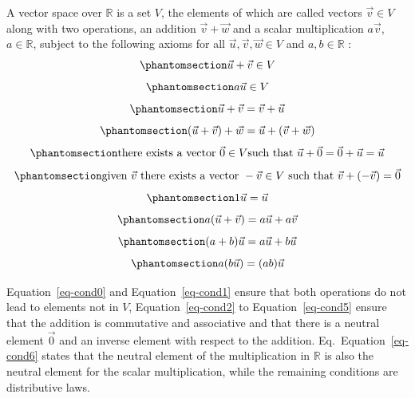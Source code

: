 \documentclass[
  letterpaper,
  DIV=11,
  numbers=noendperiod]{scrartcl}
\theoremstyle{remark}
\newenvironment{fbxSimple}[3]{\begin{tcolorbox}[enhanced, breakable,%
attach boxed title to top*={xshift=1.4pt},
boxed title style={boxrule=0.0mm, fuzzy shadow={1pt}{-1pt}{0mm}{0.1mm}{gray}, arc=.3em, rounded corners=east, sharp corners=west}, colframe=#1-color2, colbacktitle=#1-color1, colback = white, coltitle=black,  titlerule=0mm, toprule=0pt, bottomrule=.7pt, leftrule=.3em, rightrule=.7pt, outer arc=.3em,  	left=.5em, right=.5em, bottomtitle=1mm, toptitle=1mm,title=\textbf{#2}\hspace{0.5em}{#3}]}
{\end{tcolorbox}}
\begin{document}
\label{vksoverr}
\begin{fbxSimple}{Definition}{Definition 1: }{Vector Space over R}
\label{vksoverr}
A vector space over \(\mathbb{R}\) is a set \(V\), the elements of which
are called vectors \(\vec{v} \in V\) along with two operations, an
addition \(\vec{v} + \vec{w}\) and a scalar multiplication
\(a \vec{v}\), \(a \in \mathbb{R}\), subject to the following axioms for
all \(\vec{u},\vec{v}, \vec{w}\in V\) and \(a,b\in \mathbb{R}\) :
\begin{equation}\phantomsection\label{eq-cond0}{\vec{u} + \vec{v} \in  V}\end{equation}
\begin{equation}\phantomsection\label{eq-cond1}{a \vec{u}  \in  V}\end{equation}
\begin{equation}\phantomsection\label{eq-cond2}{\vec{u}+\vec{v} = \vec{v}+\vec{u}}\end{equation}
\begin{equation}\phantomsection\label{eq-cond3}{(\vec{u}+\vec{v})+\vec{w}  = \vec{u}+(\vec{v}+\vec{w})}\end{equation}
\begin{equation}\phantomsection\label{eq-cond4}{\mbox{there exists a vector } {\vec 0}  \in V \mbox{such that } \vec{u}+\vec{0} = \vec{0}+\vec{u}=\vec{u}}\end{equation}
\begin{equation}\phantomsection\label{eq-cond5}{ \mbox{given } \vec{v} \mbox{ there exists a vector } -\vec{v}  \in V  \mbox{ such that }\vec{v}+ (-\vec{v})  = \vec{0}}\end{equation}
\begin{equation}\phantomsection\label{eq-cond6}{1 \vec{u}  = \vec{u}}\end{equation}
\begin{equation}\phantomsection\label{eq-cond7}{a (\vec{u}+ \vec{v})  = a\vec{u} +a \vec{v}}\end{equation}
\begin{equation}\phantomsection\label{eq-cond8}{(a+b) \vec{u} = a\vec{u} +b \vec{u}}\end{equation}
\begin{equation}\phantomsection\label{eq-cond9}{a (b \vec{u}) =(a b) \vec{u}}\end{equation}

\end{fbxSimple}

Equation~\ref{eq-cond0} and Equation~\ref{eq-cond1} ensure that both
operations do not lead to elements not in \(V\), Equation~\ref{eq-cond2}
to Equation~\ref{eq-cond5} ensure that the addition is commutative and
associative and that there is a neutral element \(\vec{0}\) and an
inverse element with respect to the addition.
Eq.~Equation~\ref{eq-cond6} states that the neutral element of the
multiplication in \(\mathbb{R}\) is also the neutral element for the
scalar multiplication, while the remaining conditions are distributive
laws.
\end{document}

